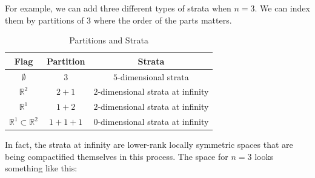 \documentclass[leqno, openany]{memoir}
\theoremstyle{definition}
\theoremstyle{remark}
\theoremstyle{plain}
\theoremstyle{definition}
\theoremstyle{remark}
\newcommand{\R}{\mathbb{R}}
\begin{document}
For example, we can add three different types of strata when $n=3$. We can index them by partitions of $3$ where the order of the parts matters.
\begin{table}[H]
    \centering
    \caption{Partitions and Strata}
    \label{tab:partitions-strata}
    \begin{tabular}{ccc}
    \toprule
    Flag & Partition & Strata \\
    \midrule
    $\emptyset$ & $3$ & $5$-dimensional strata \\
    $\R^2$ & $2+1$ & $2$-dimensional strata at infinity \\
    $\R^1$ & $1+2$ & $2$-dimensional strata at infinity \\
    $\R^1 \subset \R^2$ & $1+1+1$ & $0$-dimensional strata at infinity \\
    \bottomrule
    \end{tabular}
\end{table}
In fact, the strata at infinity are lower-rank locally symmetric spaces that are being compactified themselves in this process. The space for $n=3$ looks something like this:
\end{document}
